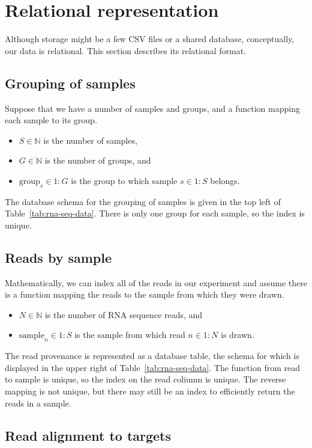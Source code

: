 \documentclass[11pt]{report}
\newcommand{\rngto}[1]{1{:}#1}
\begin{document}
\section{Relational representation}

Although storage might be a few CSV files or a shared database,
conceptually, our data is relational.  This section describes its
relational format.

\subsection{Grouping of samples}

Suppose that we have a number of samples and groups, and a function
mapping each sample to its group.
%
\begin{itemize}
\item $S \in \mathbb{N}$ is the number of samples,
\item $G \in \mathbb{N}$ is the number of groups, and
\item $\textrm{group}_s \in \rngto{G}$ is the group to which sample $s \in \rngto{S}$ belongs.
\end{itemize}
%
The database schema for the grouping of samples is given in the top
left of Table~\ref{tab:rna-seq-data}.  There is only one group for
each sample, so the index is unique.  

\subsection{Reads by sample}

Mathematically, we can index all of the reads in our experiment and
assume there is a function mapping the reads to the sample from which
they were drawn.
%
\begin{itemize}
\item $N \in \mathbb{N}$ is the number of RNA sequence reads, and
\item $\textrm{sample}_n \in \rngto{S}$ is the sample from which read
  $n \in \rngto{N}$ is drawn. 
\end{itemize}
%
The read provenance is represented as a database table, the schema for
which is displayed in the upper right of Table~\ref{tab:rna-seq-data}.
The function from read to sample is unique, so the index on the read
coliumn is unique.  The reverse mapping is not unique, but there may
still be an index to efficiently return the reads in a sample.

\subsection{Read alignment to targets}
\end{document}
